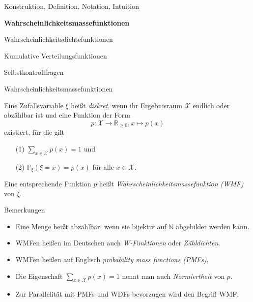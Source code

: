 \documentclass[
  8pt,
  ignorenonframetext,
]{beamer}
\providecommand{\tightlist}{%
  \setlength{\itemsep}{0pt}\setlength{\parskip}{0pt}}
\begin{document}
\begin{frame}{}
\protect\hypertarget{section-6}{}
\large
{}
\vfill

Konstruktion, Definition, Notation, Intuition

\textbf{Wahrscheinlichkeitsmassefunktionen}

Wahrscheinlichkeitsdichtefunktionen

Kumulative Verteilungsfunktionen

Selbstkontrollfragen \vfill
\end{frame}

\begin{frame}{Wahrscheinlichkeitsmassefunktionen}
\protect\hypertarget{wahrscheinlichkeitsmassefunktionen}{}
\small
\begin{definition}
\justifying
Eine Zufallsvariable $\xi$ heißt \textit{diskret}, wenn ihr Ergebnisraum $\mathcal{X}$
endlich oder abzählbar ist und eine Funktion der Form
\begin{equation}
p: \mathcal{X} \to \mathbb{R}_{\ge 0}, x \mapsto p(x)
\end{equation}
existiert, für die gilt
\begin{itemize}
\item[(1)] $\sum_{x \in \mathcal{X}} p(x) = 1$ und
\item[(2)] $\mathbb{P}_\xi(\xi = x) = p(x)$ für alle $x \in \mathcal{X}$.
\end{itemize}
Eine entsprechende Funktion $p$ heißt \textit{Wahrscheinlichkeitsmassefunktion (WMF)} von $\xi$.
\end{definition}

\footnotesize

Bemerkungen

\begin{itemize}
\tightlist
\item
  Eine Menge heißt abzählbar, wenn sie bijektiv auf \(\mathbb{N}\)
  abgebildet werden kann.
\item
  WMFen heißen im Deutschen auch \textit{W-Funktionen} oder
  \textit{Zähldichten}.
\item
  WMFen heißen auf Englisch \textit{probability mass functions (PMFs)}.
\item
  Die Eigenschaft \(\sum_{x \in \mathcal{X}} p(x) = 1\) nennt man auch
  \textit{Normiertheit} von \(p\).
\item
  Zur Parallelität mit PMFs und WDFs bevorzugen wird den Begriff WMF.
\end{itemize}
\end{frame}
\end{document}
